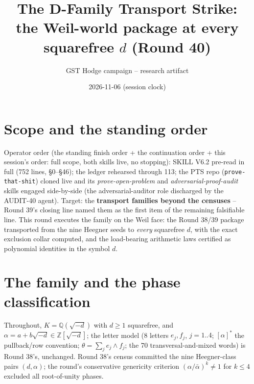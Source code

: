 \documentclass[11pt]{article}
\title{The D-Family Transport Strike:\\
the Weil-world package at every squarefree $d$ (Round 40)}
\author{GST Hodge campaign -- research artifact}
\date{2026-11-06 (session clock)}
\begin{document}
\maketitle

\section*{Scope and the standing order}

Operator order (the standing finish order + the continuation order + this
session's order: full scope, both skills live, no stopping): SKILL V6.2
pre-read in full (752 lines, \S0--\S46); the ledger rehearsed through 113;
the PTS repo (\texttt{prove-that-shit}) cloned live and its
\emph{prove-open-problem} and \emph{adversarial-proof-audit} skills engaged
side-by-side (the adversarial-auditor role discharged by the AUDIT-40
agent). Target: the \textbf{transport families beyond the censuses} --
Round 39's closing line named them as the first item of the remaining
falsifiable line. This round executes the family on the Weil face: the
Round 38/39 package transported from the nine Heegner seeds to
\emph{every} squarefree $d$, with the exact exclusion collar computed, and
the load-bearing arithmetic laws certified as polynomial identities in the
symbol $d$.

\section{The family and the phase classification}

Throughout, $K = \mathbb{Q}(\sqrt{-d})$ with $d \geq 1$ squarefree, and
$\alpha = a + b\sqrt{-d} \in \mathbb{Z}[\sqrt{-d}]$; the letter model (8
letters $e_j, f_j$, $j = 1..4$; $[\alpha]^*$ the pullback/row convention;
$\theta = \sum_j e_j \wedge f_j$; the 70 transversal-and-mixed words) is
Round 38's, unchanged. Round 38's census committed the nine Heegner-class
pairs $(d, \alpha)$; the round's conservative genericity criterion
$(\alpha/\bar\alpha)^k \neq 1$ for $k \leq 4$ excluded all root-of-unity
phases.
\end{document}
